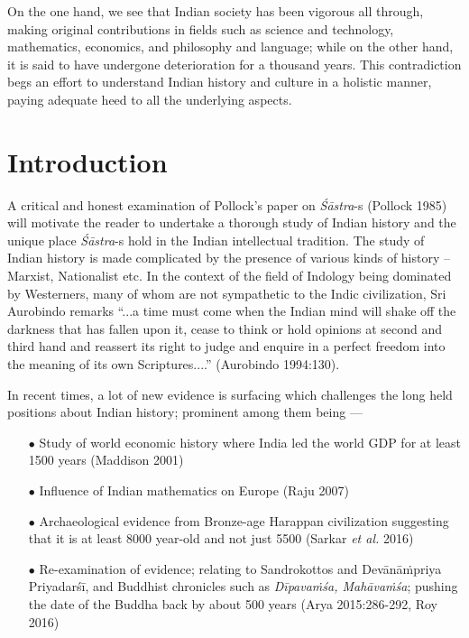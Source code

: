 On the one hand, we see that Indian society has been vigorous all through, making original contributions in ﬁelds such as science and technology, mathematics, economics, and philosophy and language; while on the other hand, it is said to have undergone deterioration for a thousand years. This contradiction begs an effort to understand Indian history and culture in a holistic manner, paying adequate heed to all the underlying aspects.

\section{Introduction}\label{art12-sec1}

A critical and honest examination of Pollock's paper on {\sl Śāstra}-s (Pollock 1985) will motivate the reader to undertake a thorough study of Indian history and the unique place {\sl Śāstra}-s hold in the Indian intellectual tradition. The study of Indian history is made complicated by the presence of various kinds of history -- Marxist, Nationalist etc. In the context of the ﬁeld of Indology being dominated by Westerners, many of whom are not sympathetic to the Indic civilization, Sri Aurobindo remarks ``...a time must come when the Indian mind will shake off the darkness that has fallen upon it, cease to think or hold opinions at second and third hand and reassert its right to judge and enquire in a perfect freedom into the meaning of its own Scriptures....'' (Aurobindo 1994:130). 

In recent times, a lot of new evidence is surfacing which challenges the long held positions about Indian history; prominent among them being ---
\begin{itemize}
\itemsep=1pt
\item[$\bullet$] Study of world economic history where India led the world GDP for at least 1500 years (Maddison 2001)

\item[$\bullet$] Inﬂuence of Indian mathematics on Europe (Raju 2007)

\item[$\bullet$] Archaeological evidence from Bronze-age Harappan civilization suggesting that it is at least 8000 year-old and not just 5500 (Sarkar {\sl et al.} 2016)

\item[$\bullet$] Re-examination of evidence; relating to Sandrokottos and Devānāṁpriya Priyadarśī, and Buddhist chronicles such as {\sl Dīpavaṁśa, Mahāvaṁśa}; pushing the date of the Buddha back by about 500 years (Arya 2015:286-292, Roy 2016)
\end{itemize}

